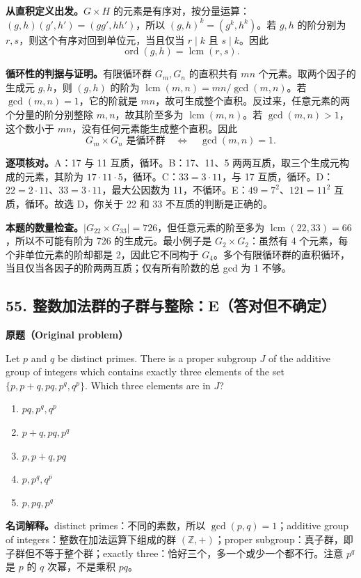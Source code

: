 \documentclass[11pt,a4paper,fontset=fandol]{ctexart}
\begin{document}
\textbf{从直积定义出发。}$G\times H$ 的元素是有序对，按分量运算：$(g,h)(g',h')=(gg',hh')$，所以 $(g,h)^k=(g^k,h^k)$。若 $g,h$ 的阶分别为 $r,s$，则这个有序对回到单位元，当且仅当 $r\mid k$ 且 $s\mid k$。因此
\begin{equation}
\operatorname{ord}(g,h)=\operatorname{lcm}(r,s).
\label{p3:product-element-order}
\end{equation}

\textbf{循环性的判据与证明。}有限循环群 $G_m,G_n$ 的直积共有 $mn$ 个元素。取两个因子的生成元 $g,h$，则 $(g,h)$ 的阶为 $\operatorname{lcm}(m,n)=mn/\gcd(m,n)$。若 $\gcd(m,n)=1$，它的阶就是 $mn$，故可生成整个直积。反过来，任意元素的两个分量的阶分别整除 $m,n$，故其阶至多为 $\operatorname{lcm}(m,n)$。若 $\gcd(m,n)>1$，这个数小于 $mn$，没有任何元素能生成整个直积。因此
\begin{equation}
G_m\times G_n\text{ 是循环群}\quad\Longleftrightarrow\quad\gcd(m,n)=1.
\label{p3:cyclic-product}
\end{equation}

\textbf{逐项核对。}A：17 与 11 互质，循环。B：17、11、5 两两互质，取三个生成元构成的元素，其阶为 $17\cdot11\cdot5$，循环。C：$33=3\cdot11$，与 17 互质，循环。D：$22=2\cdot11$、$33=3\cdot11$，最大公因数为 11，不循环。E：$49=7^2$、$121=11^2$ 互质，循环。故选 D，你关于 22 和 33 不互质的判断是正确的。

\textbf{本题的数量检查。}$|G_{22}\times G_{33}|=726$，但任意元素的阶至多为 $\operatorname{lcm}(22,33)=66$，所以不可能有阶为 726 的生成元。最小例子是 $G_2\times G_2$：虽然有 4 个元素，每个非单位元素的阶却都是 2，因此它不同构于 $G_4$。多个有限循环群的直积循环，当且仅当各因子的阶两两互质；仅有所有阶数的总 gcd 为 1 不够。

\subsection{55. 整数加法群的子群与整除：E（答对但不确定）}
\label{p3:q55}
\textbf{原题（Original problem）}

Let $p$ and $q$ be distinct primes. There is a proper subgroup $J$ of the additive group of integers which contains exactly three elements of the set $\{p,p+q,pq,p^q,q^p\}$. Which three elements are in $J$?
\begin{enumerate}[label=(\Alph*)]
\item $pq,p^q,q^p$
\item $p+q,pq,p^q$
\item $p,p+q,pq$
\item $p,p^q,q^p$
\item $p,pq,p^q$
\end{enumerate}
\textbf{名词解释。}distinct primes：不同的素数，所以 $\gcd(p,q)=1$；additive group of integers：整数在加法运算下组成的群 $(\mathbb Z,+)$；proper subgroup：真子群，即子群但不等于整个群；exactly three：恰好三个，多一个或少一个都不行。注意 $p^q$ 是 $p$ 的 $q$ 次幂，不是乘积 $pq$。
\end{document}
